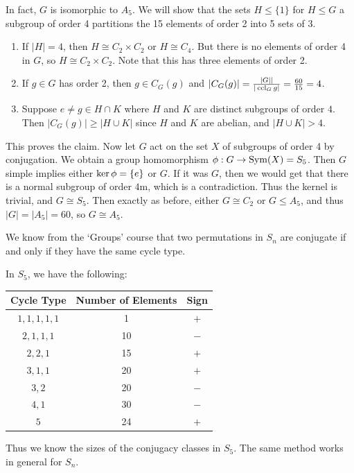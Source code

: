 \documentclass[a4paper]{scrreprt}
\begin{document}
\begin{example}
In fact, $G$ is isomorphic to $A_5$. We will show that the sets $H \leq \{1\}$ for $H \leq G$ a subgroup of order 4 partitions the 15 elements of order 2 into 5 sets of 3. 
\begin{enumerate}
	\item If $|H| = 4$, then $H \cong C_2 \times C_2$ or $H \cong C_4$. But there is no elements of order 4 in $G$, so $H \cong C_2 \times C_2$. Note that this has three elements of order 2.
	\item If $g \in G$ has order 2, then $g \in C_G(g)$ and $|C_G(g)| = \frac{|G||}{|\operatorname{ccl}_G{g}|} = \frac{60}{15} = 4$.
	\item Suppose $e \neq g \in H \cap K$ where $H$ and $K$ are distinct subgroups of order $4$. Then $|C_G(g)| \geq |H \cup K|$ since $H$ and $K$ are abelian, and $|H \cup K| > 4$.
\end{enumerate}
This proves the claim. Now let $G$ act on the set $X$ of subgroups of order 4 by conjugation. We obtain a group homomorphism $\phi:G \rightarrow \operatorname{Sym}(X) = S_5$. Then $G$ simple implies either $\operatorname{ker} \phi = \{e\}$ or $G$. If it was $G$, then we would get that there is a normal subgroup of order $4$m, which is a contradiction. Thus the kernel is trivial, and $G \cong S_5$. Then exactly as before, either $G \cong C_2$ or $G \leq A_5$, and thus $|G| = |A_5| = 60$, so $G \cong A_5$.  
\end{example}


We know from the `Groups' course that two permutations in $S_n$ are conjugate if and only if they have the same cycle type.

\begin{example}
	In $S_5$, we have the following:
	\begin{center}
		\begin{tabular}{@{}ccc@{}}
			\toprule
			Cycle Type    & Number of Elements & Sign \\ \midrule
			$1, 1, 1, 1, 1$  & 1   &   $+$  \\ 
			$2, 1, 1, 1$  & 10   &   $-$  \\
			$2, 2, 1$  & 15   &   $+$  \\
			$3, 1, 1$  & 20   &   $+$  \\
			$3, 2$  & 20   &   $-$  \\
			$4, 1$  & 30   &   $-$  \\
			$5$  & 24   &   $+$  \\
			\bottomrule
			\end{tabular}
	\end{center}
	Thus we know the sizes of the conjugacy classes in $S_5$. The same method works in general for $S_n$.
\end{example}
\end{document}
